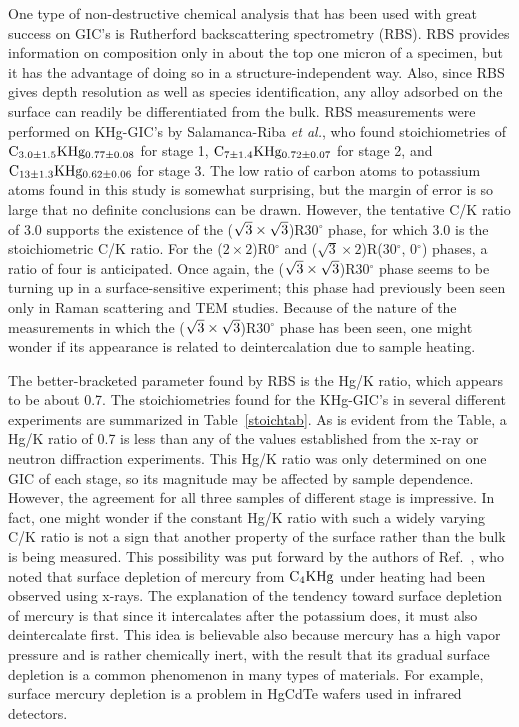         One  type of  non-destructive chemical analysis  that has been used
with  great success  on  GIC's is   Rutherford backscattering  spectrometry
(RBS).  RBS provides information  on composition only in  about the top one
micron of a specimen,\cite{S175} but it has the  advantage of doing so in a
structure-independent way.  Also, since RBS gives  depth resolution as well
as species identification, any alloy adsorbed on the surface can readily be
differentiated from the bulk.  RBS measurements were performed on KHg-GIC's
by Salamanca-Riba {\em et al.\/}, who found stoichiometries of  $\rm C_{3.0
\pm 1.5}KHg_{0.77 \pm  0.08}$ for stage  1, $\rm C_{7 \pm 1.4}KHg_{0.72 \pm
0.07}$ for stage 2, and  $\rm C_{13 \pm  1.3}KHg_{0.62 \pm 0.06}$ for stage
3.  The low ratio of carbon atoms to potassium atoms found in this study is
somewhat surprising, but the margin of error is so  large  that no definite
conclusions can be drawn.  However, the tentative C/K ratio of 3.0 supports
the existence of the ($\rm \sqrt{3}  \times \sqrt{3}$)R30$^{\circ}$ phase,
for  which 3.0  is  the   stoichiometric C/K ratio.   For the ($2    \times
2$)R0$^{\circ}$  and   ($\sqrt{3} \times  2$)R(30$^{\circ}$,   0$^{\circ}$)
phases, a ratio of four is anticipated.  Once again, the ($\rm \sqrt{3}
\times \sqrt{3}$)R30$^{\circ}$ phase seems to be turning up in a
surface-sensitive experiment; this phase had previously been seen only in
Raman scattering and TEM studies.\cite{N128}  Because of the nature of the
measurements in which the ($\rm \sqrt{3}
\times \sqrt{3}$)R30$^{\circ}$ phase has been seen, one might wonder if
its appearance is related to deintercalation due to  sample heating.

        The better-bracketed  parameter found by   RBS is the   Hg/K ratio,
which appears to be about 0.7.  The stoichiometries found for the KHg-GIC's
in several  different experiments are summarized  in Table~\ref{stoichtab}.
As is evident from the Table, a Hg/K  ratio of 0.7  is less than any of the
values established from the x-ray or neutron diffraction experiments.  This
Hg/K ratio was only determined on one GIC of  each stage,\cite{S175} so its
magnitude may be affected by sample dependence.  However, the agreement for
all  three samples of different stage  is impressive.   In  fact, one might
wonder if the constant Hg/K ratio with such a  widely  varying C/K ratio is
not a  sign that another property of  the surface rather  than  the bulk is
being  measured.   This  possibility   was put forward   by the  authors of
Ref.~\cite{S175},  who noted that  surface depletion  of mercury from  $\rm
C_4KHg$ under heating had   been   observed using  x-rays.\cite{A157}   The
explanation of  the tendency toward surface  depletion of mercury  is  that
since it  intercalates after the  potassium does,\cite{A157,elmakrini80} it
must  also  deintercalate first.   This  idea is believable   also  because
mercury has a high vapor pressure and is rather  chemically inert, with the
result  that its gradual  surface depletion  is a common phenomenon in many
types of materials.  For example, surface mercury depletion is a problem in
HgCdTe wafers used in infrared detectors.\cite{hgcdte83}

